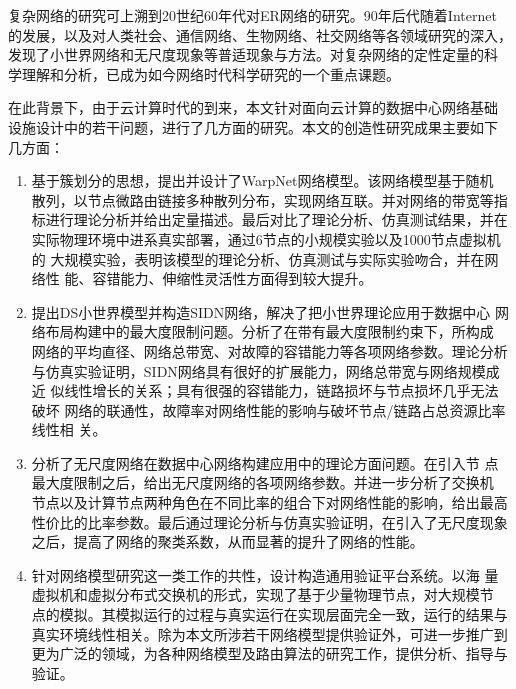 \documentclass[phd]{jnuthesis}
\begin{document}
%
\begin{preface}

复杂网络的研究可上溯到20世纪60年代对ER网络的研究。90年后代随着Internet
的发展，以及对人类社会、通信网络、生物网络、社交网络等各领域研究的深入，
发现了小世界网络和无尺度现象等普适现象与方法。对复杂网络的定性定量的科
学理解和分析，已成为如今网络时代科学研究的一个重点课题。

在此背景下，由于云计算时代的到来，本文针对面向云计算的数据中心网络基础
设施设计中的若干问题，进行了几方面的研究。本文的创造性研究成果主要如下
几方面：

\begin{enumerate}
\item 基于簇划分的思想，提出并设计了WarpNet网络模型。该网络模型基于随机
  散列，以节点微路由链接多种散列分布，实现网络互联。并对网络的带宽等指
  标进行理论分析并给出定量描述。最后对比了理论分析、仿真测试结果，并在
  实际物理环境中进系真实部署，通过6节点的小规模实验以及1000节点虚拟机的
  大规模实验，表明该模型的理论分析、仿真测试与实际实验吻合，并在网络性
  能、容错能力、伸缩性灵活性方面得到较大提升。
\item 提出DS小世界模型并构造SIDN网络，解决了把小世界理论应用于数据中心
  网络布局构建中的最大度限制问题。分析了在带有最大度限制约束下，所构成
  网络的平均直径、网络总带宽、对故障的容错能力等各项网络参数。理论分析
  与仿真实验证明，SIDN网络具有很好的扩展能力，网络总带宽与网络规模成近
  似线性增长的关系；具有很强的容错能力，链路损坏与节点损坏几乎无法破坏
  网络的联通性，故障率对网络性能的影响与破坏节点/链路占总资源比率线性相
  关。
\item 分析了无尺度网络在数据中心网络构建应用中的理论方面问题。在引入节
  点最大度限制之后，给出无尺度网络的各项网络参数。并进一步分析了交换机
  节点以及计算节点两种角色在不同比率的组合下对网络性能的影响，给出最高
  性价比的比率参数。最后通过理论分析与仿真实验证明，在引入了无尺度现象
  之后，提高了网络的聚类系数，从而显著的提升了网络的性能。

\item 针对网络模型研究这一类工作的共性，设计构造通用验证平台系统。以海
  量虚拟机和虚拟分布式交换机的形式，实现了基于少量物理节点，对大规模节
  点的模拟。其模拟运行的过程与真实运行在实现层面完全一致，运行的结果与
  真实环境线性相关。除为本文所涉若干网络模型提供验证外，可进一步推广到
  更为广泛的领域，为各种网络模型及路由算法的研究工作，提供分析、指导与
  验证。
\end{enumerate}


\end{preface}
\end{document}
